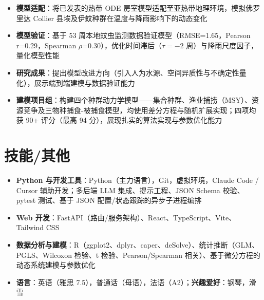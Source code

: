 \documentclass{my-resume}
\begin{document}
\begin{itemize}[parsep=0.2ex]
  \item \textbf{模型适配}：将已发表的热带 ODE 房室模型适配至亚热带地理环境，模拟佛罗里达 Collier 县埃及伊蚊种群在温度与降雨影响下的动态变化
  \item \textbf{模型验证}：基于 53 周本地蚊虫监测数据验证模型（RMSE=1.65，Pearson r=0.29，Spearman $\rho$=0.30），优化时间滞后（$\tau=-2$ 周）与降雨尺度因子，量化模型性能
  \item \textbf{研究成果}：提出模型改进方向（引入人为水源、空间异质性与不确定性量化），展示端到端建模与数据验证能力
\end{itemize}

\begin{itemize}[parsep=0.2ex]
  \item \textbf{建模项目组}：构建四个种群动力学模型——集合种群、渔业捕捞（MSY）、资源竞争及三物种捕食-被捕食模型，均使用差分方程与随机扩展实现；四项均获 90+ 评分（最高 94 分），展现扎实的算法实现与参数优化能力
\end{itemize}

\section{技能/其他}
\entrySkillsSep
\begin{itemize}[parsep=0.2ex]
  \item \textbf{Python 与开发工具}：Python（主力语言），Git，虚拟环境，Claude Code / Cursor 辅助开发；多后端 LLM 集成、提示工程、JSON Schema 校验、pytest 测试、基于 JSON 配置/状态跟踪的异步子进程编排
  \item \textbf{Web 开发}：FastAPI（路由/服务架构）、React、TypeScript、Vite、Tailwind CSS
  \item \textbf{数据分析与建模}：R（ggplot2、dplyr、caper、deSolve）、统计推断（GLM、PGLS、Wilcoxon 检验、t 检验、Pearson/Spearman 相关）、基于微分方程的动态系统建模与参数优化
  \item \textbf{语言}：英语（雅思 7.5），普通话（母语），法语（A2）；\textbf{兴趣爱好}：钢琴，滑雪
\end{itemize}
\end{document}
